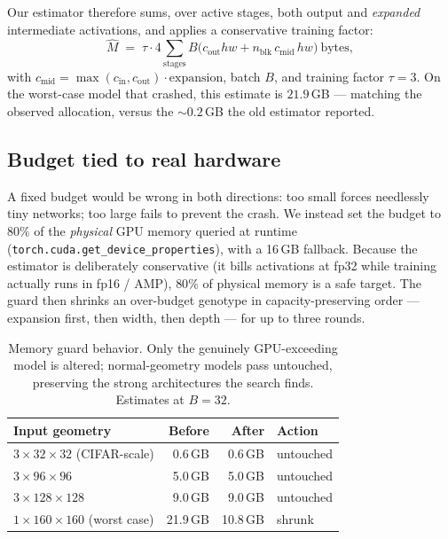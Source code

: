 \documentclass[10pt,twocolumn]{article}
\newcommand{\code}[1]{\texttt{\small #1}}
\begin{document}
Our estimator therefore sums, over active stages, both output and
\emph{expanded} intermediate activations, and applies a conservative training
factor:
\begin{equation}
\hat{M} \;=\; \tau \cdot 4 \!\!\sum_{\text{stages}}\!\! B\big(c_{\text{out}}hw +
n_{\text{blk}}\,c_{\text{mid}}\,hw\big)\ \text{bytes},
\end{equation}
with $c_{\text{mid}}=\max(c_{\text{in}},c_{\text{out}})\cdot\text{expansion}$,
batch $B$, and training factor $\tau=3$. On the worst-case model that crashed,
this estimate is $21.9$\,GB --- matching the observed allocation, versus the
$\sim0.2$\,GB the old estimator reported.

\subsection{Budget tied to real hardware}
A fixed budget would be wrong in both directions: too small forces needlessly
tiny networks; too large fails to prevent the crash. We instead set the budget
to $80\%$ of the \emph{physical} GPU memory queried at runtime
(\code{torch.cuda.get\_device\_properties}), with a 16\,GB fallback. Because the
estimator is deliberately conservative (it bills activations at fp32 while
training actually runs in fp16 / AMP), $80\%$ of physical memory is a safe
target. The guard then shrinks an over-budget genotype in capacity-preserving
order --- expansion first, then width, then depth --- for up to three rounds.

\begin{table}[t]
\centering
\caption{Memory guard behavior. Only the genuinely GPU-exceeding model is
altered; normal-geometry models pass untouched, preserving the strong
architectures the search finds. Estimates at $B{=}32$.}
\label{tab:memory}
\footnotesize
\begin{tabular}{@{}lrrl@{}}
\toprule
Input geometry & Before & After & Action\\
\midrule
$3{\times}32{\times}32$ (CIFAR-scale)  & 0.6\,GB  & 0.6\,GB  & untouched\\
$3{\times}96{\times}96$                & 5.0\,GB  & 5.0\,GB  & untouched\\
$3{\times}128{\times}128$              & 9.0\,GB  & 9.0\,GB  & untouched\\
$1{\times}160{\times}160$ (worst case) & 21.9\,GB & 10.8\,GB & shrunk\\
\bottomrule
\end{tabular}
\end{table}
\end{document}
